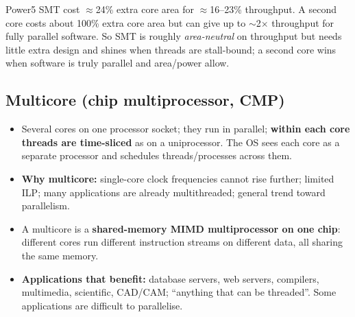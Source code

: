 \begin{ex}\bs
Power5 SMT cost $\approx$24\% extra core area for $\approx$16--23\% throughput. A second core costs about 100\% extra core area but can give up to $\sim$2$\times$ throughput for fully parallel software. So SMT is roughly \emph{area-neutral} on throughput but needs little extra design and shines when threads are stall-bound; a second core wins when software is truly parallel and area/power allow.
\end{ex}

\subsection{Multicore (chip multiprocessor, CMP)}
\begin{itemize}
\item Several cores on one processor socket; they run in parallel; \textbf{within each core threads are time-sliced} as on a uniprocessor. The OS sees each core as a separate processor and schedules threads/processes across them.
\item \textbf{Why multicore:} single-core clock frequencies cannot rise further; limited ILP; many applications are already multithreaded; general trend toward parallelism.
\item A multicore is a \textbf{shared-memory MIMD multiprocessor on one chip}: different cores run different instruction streams on different data, all sharing the same memory.
\item \textbf{Applications that benefit:} database servers, web servers, compilers, multimedia, scientific, CAD/CAM; ``anything that can be threaded''. Some applications are difficult to parallelise.
\end{itemize}

